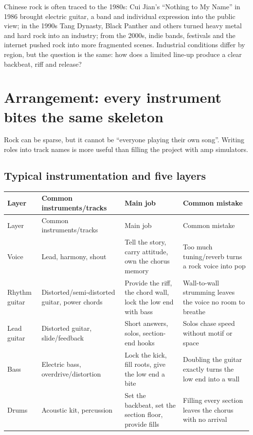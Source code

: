 Chinese rock is often traced to the 1980s: Cui Jian's ``Nothing to My Name'' in 1986 brought electric guitar, a band and individual expression into the public view; in the 1990s Tang Dynasty, Black Panther and others turned heavy metal and hard rock into an industry; from the 2000s, indie bands, festivals and the internet pushed rock into more fragmented scenes. Industrial conditions differ by region, but the question is the same: how does a limited line-up produce a clear backbeat, riff and release?

\section{Arrangement: every instrument bites the same skeleton}
\label{sec:rock-craft}

Rock can be sparse, but it cannot be ``everyone playing their own song''. Writing roles into track names is more useful than filling the project with amp simulators.

\subsection{Typical instrumentation and five layers}
\label{sec:rock-instrumentation}

\begin{longtable}{p{}p{}p{}p{}}
\toprule
Layer & Common instruments/tracks & Main job & Common mistake \\
\midrule
\endfirsthead
\toprule
Layer & Common instruments/tracks & Main job & Common mistake \\
\midrule
\endhead
Voice & Lead, harmony, shout & Tell the story, carry attitude, own the chorus memory & Too much tuning/reverb turns a rock voice into pop \\
Rhythm guitar & Distorted/semi-distorted guitar, power chords & Provide the riff, the chord wall, lock the low end with bass & Wall-to-wall strumming leaves the voice no room to breathe \\
Lead guitar & Distorted guitar, slide/feedback & Short answers, solos, section-end hooks & Solos chase speed without motif or space \\
Bass & Electric bass, overdrive/distortion & Lock the kick, fill roots, give the low end a bite & Doubling the guitar exactly turns the low end into a wall \\
Drums & Acoustic kit, percussion & Set the backbeat, set the section floor, provide fills & Filling every section leaves the chorus with no arrival \\
\bottomrule
\end{longtable}

